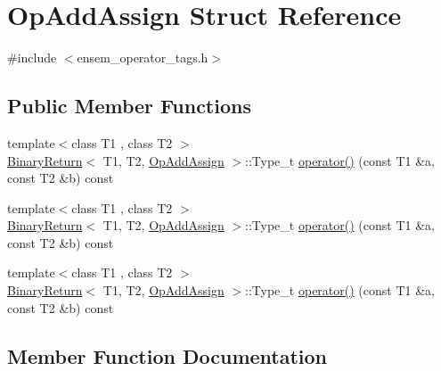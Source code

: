 \hypertarget{structOpAddAssign}{}\section{Op\+Add\+Assign Struct Reference}
\label{structOpAddAssign}


{\ttfamily \#include $<$ensem\+\_\+operator\+\_\+tags.\+h$>$}

\subsection*{Public Member Functions}
\begin{DoxyCompactItemize}
\item 
{\footnotesize template$<$class T1 , class T2 $>$ }\\\mbox{\hyperlink{structBinaryReturn}{Binary\+Return}}$<$ T1, T2, \mbox{\hyperlink{structOpAddAssign}{Op\+Add\+Assign}} $>$\+::Type\+\_\+t \mbox{\hyperlink{structOpAddAssign_a804d22e657d15e33feee3d78d8d9f2a4}{operator()}} (const T1 \&a, const T2 \&b) const
\item 
{\footnotesize template$<$class T1 , class T2 $>$ }\\\mbox{\hyperlink{structBinaryReturn}{Binary\+Return}}$<$ T1, T2, \mbox{\hyperlink{structOpAddAssign}{Op\+Add\+Assign}} $>$\+::Type\+\_\+t \mbox{\hyperlink{structOpAddAssign_a804d22e657d15e33feee3d78d8d9f2a4}{operator()}} (const T1 \&a, const T2 \&b) const
\item 
{\footnotesize template$<$class T1 , class T2 $>$ }\\\mbox{\hyperlink{structBinaryReturn}{Binary\+Return}}$<$ T1, T2, \mbox{\hyperlink{structOpAddAssign}{Op\+Add\+Assign}} $>$\+::Type\+\_\+t \mbox{\hyperlink{structOpAddAssign_a804d22e657d15e33feee3d78d8d9f2a4}{operator()}} (const T1 \&a, const T2 \&b) const
\end{DoxyCompactItemize}


\subsection{Member Function Documentation}
\mbox{\label{structOpAddAssign_a804d22e657d15e33feee3d78d8d9f2a4}} 
